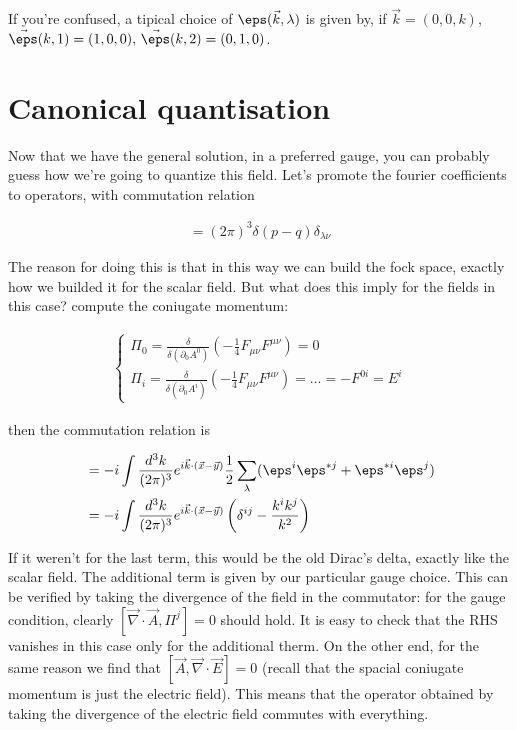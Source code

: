 \documentclass{report}
\begin{document}
If you're confused, a tipical choice of \(\eps(\vec{k}, \lambda)\) is given by, if  \(\vec{k} = (0, 0, k)\), \(\vec{\eps}(k, 1) = (1, 0, 0), \, \vec{\eps}(k, 2) = (0, 1, 0)\). 

\section{Canonical quantisation}

Now that we have the general solution, in a preferred gauge, you can probably guess how we're going to quantize this field. Let's promote the fourier coefficients to operators, with commutation relation 

\begin{align}
    [a_{p, \lambda}, a^\dagger_{q, \nu}] = (2\pi)^3\delta(p-q)\delta_{\lambda\nu}
\end{align}

The reason for doing this is that in this way we can build the fock space, exactly how we builded it for the scalar field. But what does this imply for the fields in this case? compute the coniugate momentum: 

\begin{align}
    \begin{cases}
        \Pi_0 = \frac{\delta}{\delta(\partial_0 A^0)}\left(-\frac{1}{4}F_{\mu\nu}F^{\mu\nu} \right) = 0 \\
        \Pi_i = \frac{\delta}{\delta(\partial_0 A^i)}\left(-\frac{1}{4}F_{\mu\nu}F^{\mu\nu} \right) = \ldots = -F^{0i} = E^i 
    \end{cases}
\end{align}

then the commutation relation is 

\begin{align}
    [A^i(t, \vec{x}), \Pi^j(t, \vec{y})] &= -i\int\frac{d^3k}{(2\pi)^3}e^{i\vec{k}\cdot(\vec{x}-\vec{y})}\frac{1}{2}\sum_\lambda (\eps^i\eps^{*j} + \eps^{*i}\eps^j) \\
    &= -i\int \frac{d^3k}{(2\pi)^3}e^{i\vec{k}\cdot(\vec{x}-\vec{y})}\left(\delta^{ij} - \frac{k^ik^j}{k^2} \right)
\end{align}
  
If it weren't for the last term, this would be the old Dirac's delta, exactly like the scalar field. The additional term is given by our particular gauge choice. This can be verified by taking the divergence of the field in the commutator: for the gauge condition, clearly \([\vec{\nabla}\cdot \vec{A}, \Pi^j] = 0\) should hold. It is easy to check that the RHS vanishes in this case only for the additional therm. On the other end, for the same reason we find that \([\vec{A}, \vec{\nabla}\cdot \vec{E}] = 0\) (recall that the spacial coniugate momentum is just the electric field). This means that the operator obtained by taking the divergence of the electric field commutes with everything. 
\end{document}
